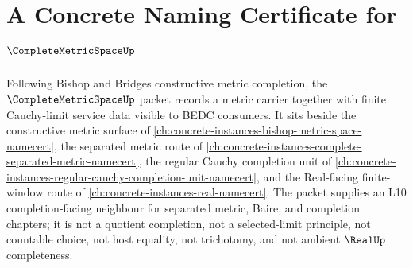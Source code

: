 \chapter{A Concrete Naming Certificate for $\CompleteMetricSpaceUp$}
\label{ch:concrete-instances-complete-metric-space-namecert}

Following Bishop and Bridges constructive metric completion, the $\CompleteMetricSpaceUp$ packet records a metric carrier together with finite Cauchy-limit service data visible to BEDC consumers. It sits beside the constructive metric surface of \autoref{ch:concrete-instances-bishop-metric-space-namecert}, the separated metric route of \autoref{ch:concrete-instances-complete-separated-metric-namecert}, the regular Cauchy completion unit of \autoref{ch:concrete-instances-regular-cauchy-completion-unit-namecert}, and the Real-facing finite-window route of \autoref{ch:concrete-instances-real-namecert}. The packet supplies an L10 completion-facing neighbour for separated metric, Baire, and completion chapters; it is not a quotient completion, not a selected-limit principle, not countable choice, not host equality, not trichotomy, and not ambient $\RealUp$ completeness.

